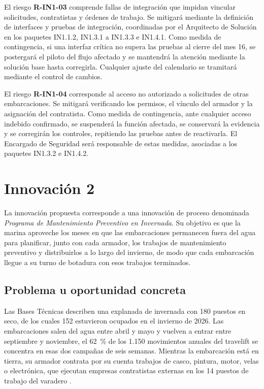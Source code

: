 El riesgo \textbf{R-IN1-03} comprende fallas de integración que impidan
vincular solicitudes, contratistas y órdenes de trabajo. Se mitigará
mediante la definición de interfaces y pruebas de integración,
coordinadas por el Arquitecto de Solución en los paquetes IN1.1.2,
IN1.3.1 a IN1.3.3 e IN1.4.1. Como medida de contingencia, si una
interfaz crítica no supera las pruebas al cierre del mes 16, se
postergará el piloto del flujo afectado y se mantendrá la atención
mediante la solución base hasta corregirla. Cualquier ajuste del
calendario se tramitará mediante el control de cambios.

El riesgo \textbf{R-IN1-04} corresponde al acceso no autorizado a
solicitudes de otras embarcaciones. Se mitigará verificando los permisos,
el vínculo del armador y la asignación del contratista. Como medida
de contingencia, ante cualquier acceso indebido confirmado, se
suspenderá la función afectada, se conservará la evidencia y se
corregirán los controles, repitiendo las pruebas antes de reactivarla.
El Encargado de Seguridad será responsable de estas medidas, asociadas
a los paquetes IN1.3.2 e IN1.4.2.

\newpage
\section{Innovación 2}

La innovación propuesta corresponde a una innovación de proceso denominada
\textit{Programa de Mantenimiento Preventivo en Invernada}. Su objetivo es que la marina aproveche los meses en que las embarcaciones permanecen fuera del agua para planificar, junto con cada armador, los trabajos de mantenimiento
preventivo y distribuirlos a lo largo del invierno, de modo que cada embarcación llegue a su turno de botadura con esos trabajos terminados.

\subsection{Problema u oportunidad concreta}

Las Bases Técnicas describen una explanada de invernada con 180 puestos en seco, de los cuales 152 estuvieron ocupados en el invierno de 2026. Las embarcaciones salen del agua entre abril y mayo y vuelven a entrar entre septiembre y noviembre, el 62~\% de los 1.150 movimientos anuales del travelift se concentra en esas dos campañas de seis semanas. Mientras la embarcación está en tierra, su armador contrata por su cuenta trabajos de casco, pintura, motor, velas o electrónica, que ejecutan empresas contratistas externas en los 14 puestos de trabajo del varadero \parencite[caps.~2 y 7; anexo~B.2]{caso07}.

